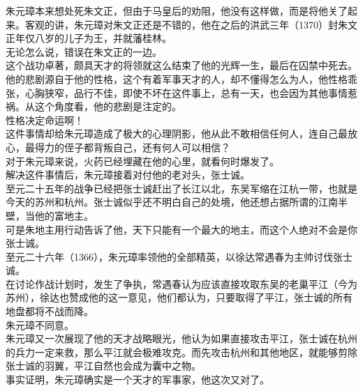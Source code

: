 \begin{multicols}{\theparacolNo}
朱元璋本来想处死朱文正，但由于马皇后的劝阻，他没有这样做，而是将他关了起来。客观的讲，朱元璋对朱文正还是不错的，他在之后的洪武三年（1370）封朱文正年仅八岁的儿子为王，并就藩桂林。\\

无论怎么说，错误在朱文正的一边。\\

这个战功卓著，颇具天才的将领就这么结束了他的光辉一生，最后在囚禁中死去。他的悲剧源自于他的性格，这个有着军事天才的人，却不懂得怎么为人，他性格乖张，心胸狭窄，品行不佳，即使不坏在这件事上，总有一天，也会因为其他事情惹祸。从这个角度看，他的悲剧是注定的。\\

性格决定命运啊！\\

这件事情却给朱元璋造成了极大的心理阴影，他从此不敢相信任何人，连自己最放心，最得力的侄子都背叛自己，还有何人可以相信？\\

对于朱元璋来说，火药已经埋藏在他的心里，就看何时爆发了。\\

解决这件事情后，朱元璋接着对付他的老对头，张士诚。\\

至元二十五年的战争已经把张士诚赶出了长江以北，东吴军缩在江杭一带，也就是今天的苏州和杭州。张士诚似乎还不明白自己的处境，他还想占据所谓的江南半壁，当他的富地主。\\

可是朱地主用行动告诉了他，天下只能有一个最大的地主，而这个人绝对不会是你张士诚。\\

至元二十六年（1366），朱元璋率领他的全部精英，以徐达常遇春为主帅讨伐张士诚。\\

在讨论作战计划时，发生了争执，常遇春认为应该直接攻取东吴的老巢平江（今为苏州），徐达也赞成他的这一意见，他们都认为，只要取得了平江，张士诚的所有地盘都将不战而降。\\

朱元璋不同意。\\

朱元璋又一次展现了他的天才战略眼光，他认为如果直接攻击平江，张士诚在杭州的兵力一定来救，那么平江就会极难攻克。而先攻击杭州和其他地区，就能够剪除张士诚的羽翼，平江自然也会成为囊中之物。\\

事实证明，朱元璋确实是一个天才的军事家，他这次又对了。\\


\end{multicols}
